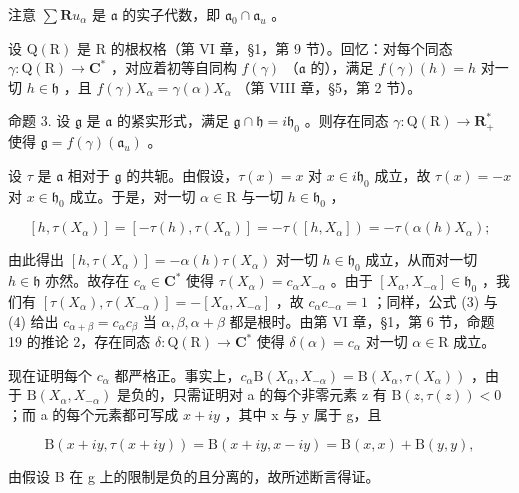 注意 \(\sum \mathbf{R}u_{\alpha}\) 是 \(\mathfrak{a}\) 的实子代数，即 \(\mathfrak{a}_0 \cap \mathfrak{a}_u\) 。

设 \(\mathrm{Q}(\mathrm{R})\) 是 R 的根权格（第 VI 章，§1，第 9 节）。回忆：对每个同态 \(\gamma : \mathrm{Q}(\mathrm{R}) \to \mathbf{C}^*\) ，对应着初等自同构 \(f(\gamma)\) （\(\mathfrak{a}\) 的），满足 \(f(\gamma)(h) = h\) 对一切 \(h \in \mathfrak{h}\) ，且 \(f(\gamma)X_{\alpha} = \gamma(\alpha)X_{\alpha}\) （第 VIII 章，§5，第 2 节）。

命题 3. 设 \(\mathfrak{g}\) 是 \(\mathfrak{a}\) 的紧实形式，满足 \(\mathfrak{g} \cap \mathfrak{h} = i\mathfrak{h}_0\) 。则存在同态 \(\gamma: \mathrm{Q}(\mathrm{R}) \to \mathbf{R}_{+}^{*}\) 使得 \(\mathfrak{g} = f(\gamma)(\mathfrak{a}_u)\) 。

设 \(\tau\) 是 \(\mathfrak{a}\) 相对于 \(\mathfrak{g}\) 的共轭。由假设，\(\tau(x) = x\) 对 \(x \in i\mathfrak{h}_0\) 成立，故 \(\tau(x) = -x\) 对 \(x \in \mathfrak{h}_0\) 成立。于是，对一切 \(\alpha \in \mathrm{R}\) 与一切 \(h \in \mathfrak{h}_0\) ，

\[
[ h, \tau (X _ {\alpha}) ] = [ - \tau (h), \tau (X _ {\alpha}) ] = - \tau ([ h, X _ {\alpha} ]) = - \tau (\alpha (h) X _ {\alpha});
\]

由此得出 \([h, \tau(X_{\alpha})] = -\alpha(h)\tau(X_{\alpha})\) 对一切 \(h \in \mathfrak{h}_0\) 成立，从而对一切 \(h \in \mathfrak{h}\) 亦然。故存在 \(c_{\alpha} \in \mathbf{C}^*\) 使得 \(\tau(X_{\alpha}) = c_{\alpha}X_{-\alpha}\) 。由于 \([X_{\alpha}, X_{-\alpha}] \in \mathfrak{h}_0\) ，我们有 \([\tau(X_{\alpha}), \tau(X_{-\alpha})] = -[X_{\alpha}, X_{-\alpha}]\) ，故 \(c_{\alpha}c_{-\alpha} = 1\) ；同样，公式 (3) 与 (4) 给出 \(c_{\alpha + \beta} = c_{\alpha}c_{\beta}\) 当 \(\alpha, \beta, \alpha + \beta\) 都是根时。由第 VI 章，§1，第 6 节，命题 19 的推论 2，存在同态 \(\delta: \mathrm{Q}(\mathrm{R}) \to \mathbf{C}^*\) 使得 \(\delta(\alpha) = c_{\alpha}\) 对一切 \(\alpha \in \mathrm{R}\) 成立。

现在证明每个 \(c_{\alpha}\) 都严格正。事实上，\(c_{\alpha}\mathrm{B}(X_{\alpha},X_{-\alpha})=\mathrm{B}(X_{\alpha},\tau(X_{\alpha}))\) ，由于 \(\mathrm{B}(X_{\alpha},X_{-\alpha})\) 是负的，只需证明对 a 的每个非零元素 z 有 \(\mathrm{B}(z,\tau(z))<0\) ；而 a 的每个元素都可写成 \(x+iy\) ，其中 x 与 y 属于 g，且

\[
\mathrm{B} (x + i y, \tau (x + i y)) = \mathrm{B} (x + i y, x - i y) = \mathrm{B} (x, x) + \mathrm{B} (y, y),
\]

由假设 B 在 g 上的限制是负的且分离的，故所述断言得证。

